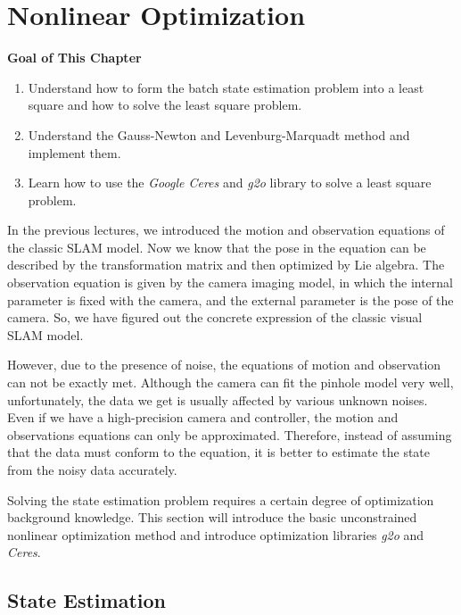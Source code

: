 \chapter{Nonlinear Optimization}
\label{cpt:6}
\begin{mdframed}  
	\textbf{Goal of This Chapter}
	\begin{enumerate}[labelindent=0em,leftmargin=1.5em]
		\item Understand how to form the batch state estimation problem into a least square and how to solve the least square problem.
		\item Understand the Gauss-Newton and Levenburg-Marquadt method and implement them.
		\item Learn how to use the \textit{Google Ceres} and \textit{g2o} library to solve a least square problem.
	\end{enumerate}
\end{mdframed} 

In the previous lectures, we introduced the motion and observation equations of the classic SLAM model. Now we know that the pose in the equation can be described by the transformation matrix and then optimized by Lie algebra. The observation equation is given by the camera imaging model, in which the internal parameter is fixed with the camera, and the external parameter is the pose of the camera. So, we have figured out the concrete expression of the classic visual SLAM model.

However, due to the presence of noise, the equations of motion and observation can not be exactly met. Although the camera can fit the pinhole model very well, unfortunately, the data we get is usually affected by various unknown noises. Even if we have a high-precision camera and controller, the motion and observations equations can only be approximated. Therefore, instead of assuming that the data must conform to the equation, it is better to estimate the state from the noisy data accurately.

Solving the state estimation problem requires a certain degree of optimization background knowledge. This section will introduce the basic unconstrained nonlinear optimization method and introduce optimization libraries \textit{g2o} and \textit{Ceres}.

\newpage


\newpage
\section{State Estimation}
